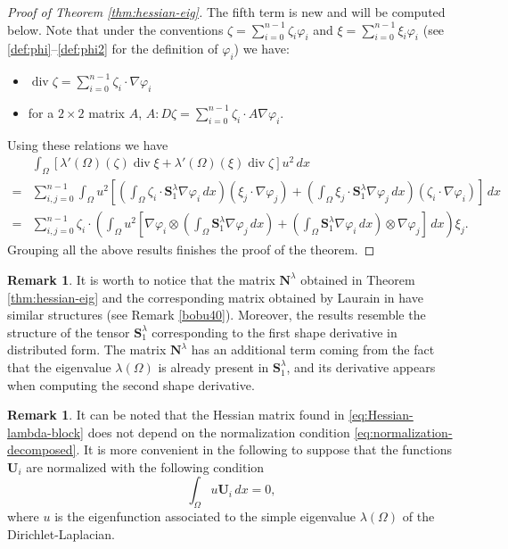 \documentclass[JEP,XML,SOM,Unicode,ThmDefs,NoFloatCountersInSection,published]{cedram}
\theoremstyle{plain}
\theoremstyle{definition}
\newtheorem{rem}[thm]{Remark}
\newcommand{\di}{\operatorname{div}}
\newcommand{\bo}[1]{{\boldsymbol#1}}
\begin{document}
\begin{proof}[Proof of Theorem \ref{thm:hessian-eig}]
The fifth term is new and will be computed below. Note that under the conventions $\zeta = \sum_{i=0}^{n-1} \zeta_i \varphi_i$ and $\xi = \sum_{i=0}^{n-1} \xi_i \varphi_i$ (see \eqref{def:phi}--\eqref{def:phi2} for the definition of $\varphi_i$) we have:
\begin{itemize}
\item $\di \zeta = \sum_{i=0}^{n-1} \zeta_i \cdot \nabla \varphi_i$
\item for a $2\times 2$ matrix $A$, $A : D\zeta = \sum_{i=0}^{n-1} \zeta_i \cdot A\nabla \varphi_i$.
\end{itemize}
Using these relations we have
\begin{align*} &\int_\Omega [\lambda'(\Omega)(\zeta) \di \xi +\lambda'(\Omega)(\xi)\di \zeta] u^2\, dx\\
= & \sum_{i,j=0}^{n-1} \int_\Omega u^2 \left[\left(\int_\Omega \zeta_i \cdot \bo S_1^\lambda \nabla \varphi_i\, dx \right)(\xi_j \cdot \nabla \varphi_j)+\left(\int_\Omega \xi_j \cdot \bo S_1^\lambda \nabla \varphi_j\, dx \right)(\zeta_i \cdot \nabla \varphi_i)\right]\, dx\\
= & \sum_{i,j=0}^{n-1} \zeta_i\cdot \left(\int_\Omega u^2\left[\nabla \varphi_i \otimes \left(\int_\Omega \bo S_1^\lambda \nabla \varphi_j\, dx \right)
+ \left(\int_\Omega \bo S_1^\lambda \nabla \varphi_i\, dx\right)\otimes \nabla \varphi_j \right]\, dx\right) \xi_j.
\end{align*}
Grouping all the above results finishes the proof of the theorem.
\end{proof}

\begin{rem}
It is worth to notice that the matrix $\bo N^\lambda$ obtained in Theorem \ref{thm:hessian-eig} and the corresponding matrix obtained by Laurain in \cite[Prop.\,14]{laurain2ndDeriv} have similar structures (see Remark \ref{bobu40}). Moreover, the results resemble the structure of the tensor $\bo S_1^\lambda$ corresponding to the first shape derivative in distributed form. The matrix $\bo N^\lambda$ has an additional term coming from the fact that the eigenvalue $\lambda(\Omega)$ is already present in $\bo S_1^\lambda$, and its derivative appears when computing the second shape derivative.
\end{rem}

\begin{rem}
It can be noted that the Hessian matrix found in \eqref{eq:Hessian-lambda-block} does not depend on the normalization condition \eqref{eq:normalization-decomposed}. It is more convenient in the following to suppose that the functions $\bo U_i$ are normalized with the following condition
\begin{equation}
\int_\Omega u \bo U_i\, dx = 0,
\label{eq:normalization-alternative}
\end{equation}
where $u$ is the eigenfunction associated to the simple eigenvalue $\lambda(\Omega)$ of the Dirichlet-Laplacian.
\end{rem}
\end{document}
